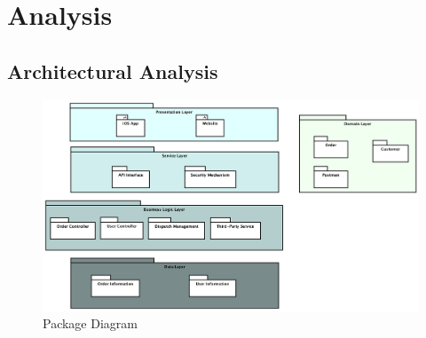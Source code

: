 \documentclass[12pt]{scrreprt}
\begin{document}
\chapter{Analysis}
\section{Architectural Analysis}
\begin{figure}[H]
  \centering\includegraphics[width=6in]{DocumentRes/PackageDiagram.png}
  \caption{Package Diagram}
\end{figure}
\end{document}
